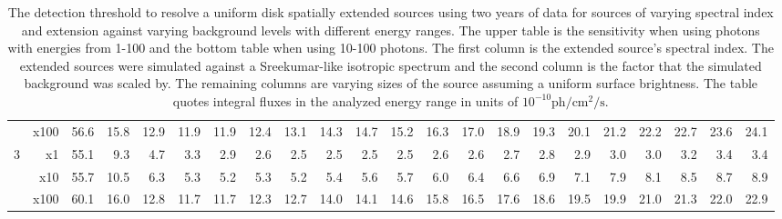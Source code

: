 \documentclass[12pt,preprint]{aastex}
\newcommand{\gev}{\text{GeV}\xspace}
\newcommand{\ph}{\text{ph}\xspace}
\newcommand{\cm}{\text{cm}\xspace}
\renewcommand{\sec}{\text{s}\xspace}
\begin{document}
\begin{table}
\begin{centering}
\begin{tabular}{r|r|rrrrrrrrrrrrrrrrrrrr}
                 &     x100 &       56.6 &       15.8 &       12.9 &       11.9 &       11.9 &       12.4 &       13.1 &       14.3 &       14.7 &       15.2 &       16.3 &       17.0 &       18.9 &       19.3 &       20.1 &       21.2 &       22.2 &       22.7 &       23.6 &       24.1 \\
               3 &       x1 &       55.1 &        9.3 &        4.7 &        3.3 &        2.9 &        2.6 &        2.5 &        2.5 &        2.5 &        2.5 &        2.6 &        2.6 &        2.7 &        2.8 &        2.9 &        3.0 &        3.0 &        3.2 &        3.4 &        3.4 \\
                 &      x10 &       55.7 &       10.5 &        6.3 &        5.3 &        5.2 &        5.3 &        5.2 &        5.4 &        5.6 &        5.7 &        6.0 &        6.4 &        6.6 &        6.9 &        7.1 &        7.9 &        8.1 &        8.5 &        8.7 &        8.9 \\
                 &     x100 &       60.1 &       16.0 &       12.8 &       11.7 &       11.7 &       12.3 &       12.7 &       14.0 &       14.1 &       14.6 &       15.8 &       16.5 &       17.6 &       18.6 &       19.5 &       19.9 &       21.0 &       21.3 &       22.0 &       22.9 \\
        \hline
      \end{tabular}
      \caption{The detection threshold to resolve a uniform disk spatially
      extended sources using two years of data for sources of varying
      spectral index and extension against varying background levels
      with different energy ranges.  The upper table is the sensitivity
      when using photons with energies from 1-100 \gev and the bottom
      table when using 10-100 \gev photons. The first column is
      the extended source's spectral index.  The extended sources
      were simulated against a Sreekumar-like isotropic spectrum and
      the second column is the factor that the simulated background
      was scaled by. The remaining columns are varying sizes of the
      source assuming a uniform surface brightness. The table quotes integral
      fluxes in the analyzed energy range in units of
      $10^{-10} \ph/\cm^2/\sec$.  
      }\label{all_sensitivity_table}
    \end{centering}
  \end{table}
\end{document}
